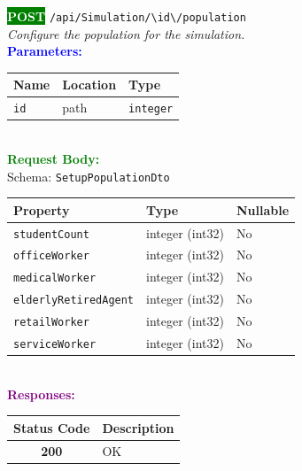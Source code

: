 \begin{tcolorbox}[
    colback=green!5,
    colframe=green,
    arc=2mm,
    boxrule=1pt,
    left=5pt,
    right=5pt,
    top=5pt,
    bottom=5pt
]
\noindent\colorbox{green}{\textcolor{white}{\textbf{POST}}} 
\texttt{\large /api/Simulation/\textbackslash{}{id\textbackslash{}}/population}\\[0.3em]
\textit{Configure the population for the simulation.}\\[0.3em]
\vspace{0.3em}
\textbf{\textcolor{blue}{Parameters:}}\\[0.2em]
\begin{tabular}{|l|l|l|}
\hline
\rowcolor{gray!20}
\textbf{Name} & \textbf{Location} & \textbf{Type} \\ \hline
\texttt{id} & path & \texttt{integer} \\ \hline
\end{tabular}\\[0.5em]
\vspace{0.3em}
\textbf{\textcolor{green}{Request Body:}}\\[0.2em]
Schema: \texttt{SetupPopulationDto}\\[0.3em]
\begin{tabular}{|l|l|l|}
\hline
\rowcolor{green!10}
\textbf{Property} & \textbf{Type} & \textbf{Nullable} \\ \hline
\texttt{studentCount} & integer (int32) & No \\ \hline
\rowcolor{gray!5}
\texttt{officeWorker} & integer (int32) & No \\ \hline
\texttt{medicalWorker} & integer (int32) & No \\ \hline
\rowcolor{gray!5}
\texttt{elderlyRetiredAgent} & integer (int32) & No \\ \hline
\texttt{retailWorker} & integer (int32) & No \\ \hline
\rowcolor{gray!5}
\texttt{serviceWorker} & integer (int32) & No \\ \hline
\end{tabular}\\[0.5em]
\vspace{0.3em}
\textbf{\textcolor{purple}{Responses:}}\\[0.2em]
\begin{tabular}{|c|p{10cm}|}
\hline
\rowcolor{gray!20}
\textbf{Status Code} & \textbf{Description} \\ \hline
\colorbox{green!20}{\textbf{200}} & OK \\ \hline
\end{tabular}
\end{tcolorbox}
\vspace{0.5em}

